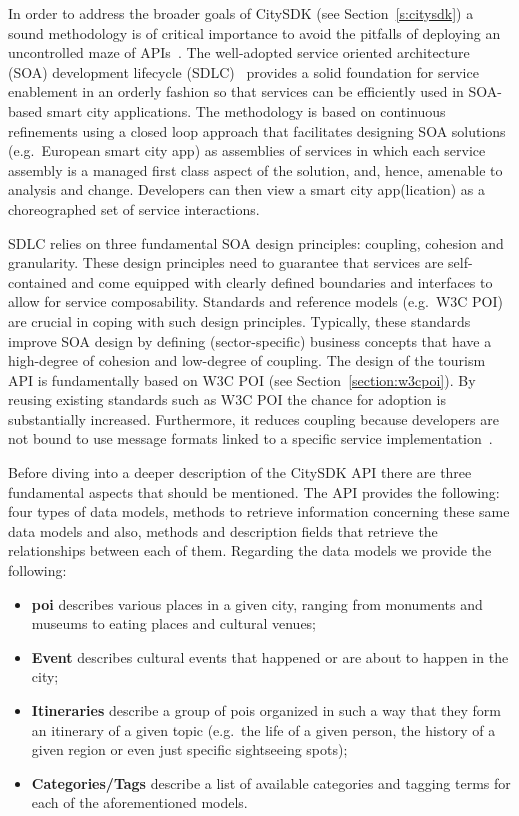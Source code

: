 \documentclass[times,doublespace]{ettauth}%
\begin{document}
In order to address the broader goals of CitySDK (see Section~\ref{s:citysdk}) a sound methodology is of critical importance to avoid the pitfalls of deploying an uncontrolled maze of APIs~\cite{papazoglou2007,monsieur2012}.
The well-adopted service oriented architecture (SOA) development lifecycle (SDLC)~\cite{papazoglou2007} provides a solid foundation for service enablement in an orderly fashion so that services can be efficiently used in SOA-based smart city applications.
The methodology is based on continuous refinements using a closed loop approach that facilitates designing SOA solutions (e.g.\ European smart city app) as assemblies of services in which each service assembly is a managed first class aspect of the solution, and, hence, amenable to analysis and change. Developers can then view a smart city app(lication) as a choreographed set of service interactions.

SDLC relies on three fundamental SOA design principles: coupling, cohesion and granularity.
These design principles need to guarantee that services are self-contained and come equipped with clearly defined boundaries and interfaces to allow for service composability. Standards and reference models (e.g.\  W3C POI) are crucial in coping with such design principles.
Typically, these standards improve SOA design by defining (sector-specific) business concepts that have a high-degree of cohesion and low-degree of coupling.
The design of the tourism API is fundamentally based on W3C POI (see Section~\ref{section:w3cpoi}).
By reusing existing standards such as W3C POI the chance for adoption is substantially increased. Furthermore, it reduces coupling because developers are not bound to use message formats linked to a specific service implementation~\cite{papazoglou2007}.

Before diving into a deeper description of the CitySDK API there are three fundamental aspects that should be mentioned.
The API provides the following: four types of data models, methods to retrieve information concerning these same data models and also, methods and description fields that retrieve the relationships between each of them.
Regarding the data models we provide the following:
\begin{itemize}
\item \textbf{\ac{poi}} describes various places in a given city, ranging from monuments and museums to eating places and cultural venues; 
\item \textbf{Event} describes cultural events that happened or are about to happen in the city;
\item \textbf{Itineraries} describe a group of \acp{poi} organized in such a way that they form an itinerary of a given topic (e.g.\  the life of a given person, the history of a given region or even just specific sightseeing spots);
\item \textbf{Categories/Tags} describe a list of available categories and tagging terms for each of the aforementioned models.
\end{itemize}
\end{document}

